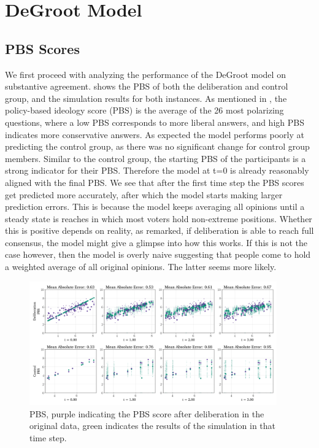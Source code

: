 
\newpage
\section{DeGroot Model} \label{degroot_results} \subsection{PBS Scores} We
first proceed with analyzing the performance of the DeGroot model on
substantive agreement.  shows the PBS of both the
deliberation and control group, and the simulation results for both instances.
As mentioned in , the policy-based ideology score (PBS) is the
average of the 26 most polarizing questions, where a low PBS corresponds to
more liberal answers, and high PBS indicates more conservative answers. As
expected the model performs poorly at predicting the control group, as there
was no significant change for control group members. Similar to the control
group, the starting  PBS of the participants is a strong indicator for
their  PBS. Therefore the model at t=0 is already reasonably aligned with
the final  PBS. We see that after the first time step the PBS scores get
predicted more accurately, after which the model starts making larger
prediction errors. This is because the model keeps averaging all opinions until
a steady state is reaches in which most voters hold non-extreme positions.
Whether this is positive depends on reality, as
\citet{elsterMARKETFORUMThree2002} remarked, if deliberation is able to reach
full consensus, the model might give a glimpse into how this works. If this is
not the case however, then the model is overly naive suggesting that people
come to hold a weighted average of all original opinions. The latter seems more
likely.


\begin{figure}[h]
	\begin{center}
		\includegraphics[width=0.95\textwidth]{Figures/pbs_scores.png}
	\end{center}
	\caption{ PBS, purple indicating the PBS score after deliberation in the original data, green indicates the results of the simulation in that time step.}\label{fig:pbs}
\end{figure}

